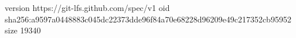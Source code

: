 version https://git-lfs.github.com/spec/v1
oid sha256:a9597a0448883c045dc22373dde96f84a70e68228d96209e49c217352cb95952
size 19340
